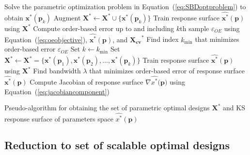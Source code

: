 \begin{algorithm}
	\DontPrintSemicolon %
	 {
		Solve the parametric optimization problem in Equation~(\ref{eq:SBDoptproblem}) to obtain $\mathbf{x}^*(\mathbf{p}_k)$\;
		Augment $\mathbf{X}^* \gets \mathbf{X}^* \cup \{ \mathbf{x}^*(\mathbf{p}_k) \} $\;
		Train response surface $\hat{\mathbf{x}^*}(\mathbf{p})$ using $\mathbf{X}^*$\;
		Compute order-based error up to and including $k$th sample $\varepsilon_{OE}$ using Equation~(\ref{eq:oeobjective}), $\hat{\mathbf{x}^*}(\mathbf{p})$, and $\mathbf{X_{cv}}^*$\;
	}
	Find index $k_{\textrm{min}}$ that minimizes order-based error $\varepsilon_{OE}$\;
	Set $k \gets k_{\textrm{min}} $ \;
	Set $\mathbf{X}^* \gets \mathbf{X}^*= \{ \mathbf{x}^*(\mathbf{p}_1),\mathbf{x}^*(\mathbf{p}_2),\ldots,\mathbf{x}^*(\mathbf{p}_k) \} $ \;
	Train response surface $\hat{\mathbf{x}^*}(\mathbf{p})$ using $\mathbf{X}^*$ \;
	Find bandwidth $\lambda$ that minimizes order-based error of response surface $\hat{\mathbf{x}^*}(\mathbf{p})$\;
	Compute Jacobian of response surface $\nabla\hat{{x}^*}(\mathbf{p)}$ using Equation~(\ref{eq:jacobiancomponent})\;
	\caption{Pseudo-algorithm for obtaining the set of parametric optimal designs $\mathbf{X}^*$ and \ac{KS} response surface of parameters space $\hat{{x}^*}(\mathbf{p})$}
	\label{algo:PODalgo}
\end{algorithm}

\subsection{Reduction to set of scalable optimal designs} \label{subsec:SBDfAM}

